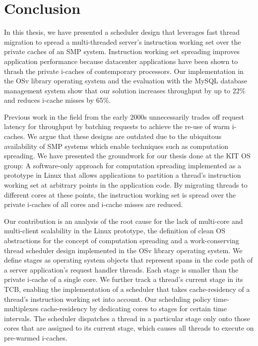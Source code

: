 \documentclass[12pt,a4paper]{book}
\begin{document}
\chapter{Conclusion}\label{ch:concl}

In this thesis, we have presented a scheduler design that leverages fast thread migration to spread a multi-threaded server's instruction working set over the private caches of an SMP system.
Instruction working set spreading improves application performance because datacenter applications have been shown to thrash the private i-caches of contemporary processors.
Our implementation in the OSv library operating system and the evaluation with the MySQL database management system show that our solution increases throughput by up to 22\% and reduces i-cache misses by 65\%.

Previous work in the field from the early 2000s unnecessarily trades off request latency for throughput by batching requests to achieve the re-use of warm i-caches.
We argue that these designs are outdated due to the ubiquitous availability of SMP systems which enable techniques such as computation spreading.
We have presented the groundwork for our thesis done at the KIT OS group:
A software-only approach for computation spreading implemented as a prototype in Linux that allows applications to partition a thread's instruction working set at arbitrary points in the application code.
By migrating threads to different cores at these points, the instruction working set is spread over the private i-caches of all cores and i-cache misses are reduced.

Our contribution is an analysis of the root cause for the lack of multi-core and multi-client scalability in the Linux prototype,
the definition of clean OS abstractions for the concept of computation spreading and
a work-conserving thread scheduler design implemented in the OSv library operating system.
We define stages as operating system objects that represent spans in the code path of a server application's request handler threads.
Each stage is smaller than the private i-cache of a single core.
We further track a thread's current stage in its TCB, enabling the implementation of a scheduler that takes cache-residency of a thread's instruction working set into account.
Our scheduling policy time-multiplexes cache-residency by dedicating cores to stages for certain time intervals.
The scheduler dispatches a thread in a particular stage only onto those cores that are assigned to its current stage, which causes all threads to execute on pre-warmed i-caches.
\end{document}
